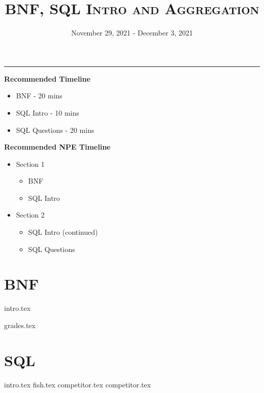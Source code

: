 \documentclass{exam}
\title{\textsc{BNF, SQL Intro and Aggregation}}
\date{November 29, 2021 - December 3, 2021}
\begin{document}
\maketitle\rule{\textwidth}{0.15em}
\fontsize{12}{15}\selectfont

\begin{blocksection}
  \begin{guide}
    \textbf{Recommended Timeline}
    \begin{itemize}
      \item BNF - 20 mins
      \item SQL Intro - 10 mins
      \item SQL Questions - 20 mins
    \end{itemize}
  \end{guide}
\end{blocksection}

\begin{blocksection}
  \begin{guide}
    \textbf{Recommended NPE Timeline}
    \begin{itemize}
      \item Section 1
            \begin{itemize}
              \item BNF
              \item SQL Intro
            \end{itemize}
      \item Section 2
            \begin{itemize}
              \item SQL Intro (continued)
              \item SQL Questions
            \end{itemize}
    \end{itemize}
  \end{guide}
\end{blocksection}

\section{BNF}
{intro.tex}

\begin{questions}
  {grades.tex}
\end{questions}

\newpage
\section{SQL}
{intro.tex}
{fish.tex}
{competitor.tex}
{competitor.tex}
\end{document}
